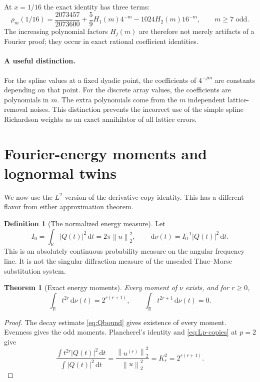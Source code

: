 \documentclass[11pt,a4paper]{article}
\numberwithin{equation}{section}
\newtheorem{theorem}{Theorem}[section]
\theoremstyle{definition}
\newtheorem{definition}[definition]{Definition}
\newcommand{\R}{\mathbb R}
\newcommand{\dd}{\,\mathrm d}
\newcommand{\norm}[1]{\left\lVert #1\right\rVert}
\begin{document}
At $x=1/16$ the exact identity has three terms:
\begin{equation}
 \rho_m(1/16)=\frac{2073457}{2073600}
       +\frac59H_1(m)4^{-m}
       -1024H_2(m)16^{-m},
 \qquad m\geq7\text{ odd}.
 \label{eq:sixteenth-lattice}
\end{equation}
The increasing polynomial factors $H_j(m)$ are therefore not
merely artifacts of a Fourier proof; they occur in exact rational
coefficient identities.

\paragraph{A useful distinction.}
For the spline values at a fixed dyadic point, the coefficients of
$4^{-jm}$ are constants depending on that point. For the discrete
array values, the coefficients are polynomials in $m$. The extra
polynomials come from the $m$ independent lattice-removal noises.
This distinction prevents the incorrect use of the simple spline
Richardson weights as an exact annihilator of all lattice errors.

\section{Fourier-energy moments and lognormal twins}\label{sec:spectral}

We now use the $L^2$ version of the derivative-copy identity. This
has a different flavor from either approximation theorem.

\begin{definition}[The normalized energy measure]
Let
\begin{equation}
 I_0=\int_{\R}|Q(t)|^2\dd t=2\pi\norm{u}_2^2,
 \qquad \dd\nu(t)=I_0^{-1}|Q(t)|^2\dd t.
 \label{eq:nu-def}
\end{equation}
This is an absolutely continuous probability measure on the angular
frequency line. It is not the singular diffraction measure of the
unscaled Thue--Morse substitution system.
\end{definition}

\begin{theorem}[Exact energy moments]\label{thm:energy-moments}
Every moment of $\nu$ exists, and for $r\geq0$,
\begin{equation}
 \int_{\R}t^{2r}\dd\nu(t)=2^{r(r+1)},\qquad
 \int_{\R}t^{2r+1}\dd\nu(t)=0.
 \label{eq:energy-moments}
\end{equation}
\end{theorem}
\begin{proof}
The decay estimate \eqref{eq:Qbound} gives existence of every
moment. Evenness gives the odd moments. Plancherel's identity and
\eqref{eq:Lp-copies} at $p=2$ give
\begin{equation}
 \frac{\int t^{2r}|Q(t)|^2\dd t}{\int|Q(t)|^2\dd t}
 =\frac{\norm{u^{(r)}}_2^2}{\norm{u}_2^2}
 =K_r^2=2^{r(r+1)}.
\end{equation}
\end{proof}
\end{document}
